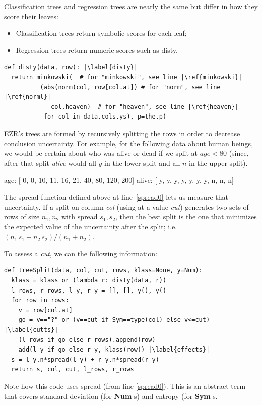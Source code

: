 \documentclass[AMA,STIX2COL]{WileyNJDv5}
\newcommand{\cls}[1]{%
  \setlength{\fboxsep}{1.5pt}%
  \colorbox{clsbg}{\sffamily\bfseries{#1}}%
}
\begin{document}
 Classification trees and regression trees are nearly the same
but differ  in how they score  their leaves:
 \begin{itemize}
 \item Classification trees return symbolic   scores
 for each leaf;
 \item Regression trees return numeric scores such as \textsf{disty}.
 \end{itemize}
\begin{verbatim}
def disty(data, row): |\label{disty}| 
  return minkowski(  # for "minkowski", see line |\ref{minkowski}|
          (abs(norm(col, row[col.at]) # for "norm", see line |\ref{norml}|
           - col.heaven)  # for "heaven", see line |\ref{heaven}|
           for col in data.cols.ys), p=the.p)
\end{verbatim}       
EZR's   trees are formed by recursively splitting the rows in order
 to decrease conclusion uncertainty. 
 For example,   for the following data about human beings,
 we would be certain about who was alive or dead if we split
 at   $\mathit{age}<80$
 (since, after that split {\em alive} would all $y$
 in the lower split and all $n$ in the upper split).
 \begin{repl}
 age:   [ 0, 0, 10, 11, 16, 21, 40, 80, 120, 200]
 alive: [ y, y,  y,  y,  y,  y,  y,  n,   n,   n]
\end{repl}
The \textsf{spread} function defined above at line~\ref{spread0} lets us
measure that uncertainty.
If a split on column {\em col} (using at a value {\em cut}) generates two sets of rows of
size $n_1,n_2$ with \textsf{spread} $s_1,s_2$, then the best split is
the one that minimizes the expected value of the uncertainty after
the split; i.e. $(n_1\, s_1 + n_2\, s_2)/(n_1 + n_2)$.

To assess a {\em cut},
we can the following information:
\begin{verbatim}
def treeSplit(data, col, cut, rows, klass=None, y=Num):
  klass = klass or (lambda r: disty(data, r))
  l_rows, r_rows, l_y, r_y = [], [], y(), y()
  for row in rows:
    v = row[col.at]
    go = v=="?" or (v==cut if Sym==type(col) else v<=cut) |\label{cutts}|
    (l_rows if go else r_rows).append(row)
    add(l_y if go else r_y, klass(row)) |\label{effects}|
  s = l_y.n*spread(l_y) + r_y.n*spread(r_y)
  return s, col, cut, l_rows, r_rows
\end{verbatim}
Note how this code  uses  \textsf{spread} (from line \ref{spread0}). This is an abstract term
that covers standard deviation (for \cls{Num}s) and entropy (for \cls{Sym}s.
\end{document}
